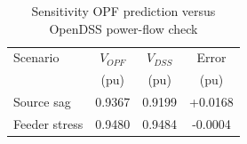 \begin{table}[!t]
\caption{Sensitivity OPF prediction versus OpenDSS power-flow check}
\label{tab:opf_comparison}
\centering
\begin{tabular}{lccc}
\toprule
Scenario & $V_{OPF}$ & $V_{DSS}$ & Error \\
 & (pu) & (pu) & (pu) \\
\midrule
Source sag & 0.9367 & 0.9199 & +0.0168 \\
Feeder stress & 0.9480 & 0.9484 & -0.0004 \\
\bottomrule
\end{tabular}
\end{table}
